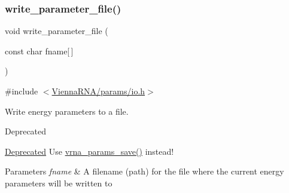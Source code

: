 \subsubsection{\texorpdfstring{write\_parameter\_file()}{write\_parameter\_file()}}
{\footnotesize\ttfamily void write\+\_\+parameter\+\_\+file (\begin{DoxyParamCaption}\item[{const char}]{fname\mbox{[}$\,$\mbox{]} }\end{DoxyParamCaption})}



{\ttfamily \#include $<$\mbox{\hyperlink{io_8h}{Vienna\+R\+N\+A/params/io.\+h}}$>$}



Write energy parameters to a file. 

\begin{DoxyRefDesc}{Deprecated}
\item[\mbox{\hyperlink{deprecated__deprecated000151}{Deprecated}}]Use \mbox{\hyperlink{group__energy__parameters__rw_ga0de3731b3e4017c52bd678549f6c4ae5}{vrna\+\_\+params\+\_\+save()}} instead! \end{DoxyRefDesc}

\begin{DoxyParams}{Parameters}
{\em fname} & A filename (path) for the file where the current energy parameters will be written to \\
\hline
\end{DoxyParams}

